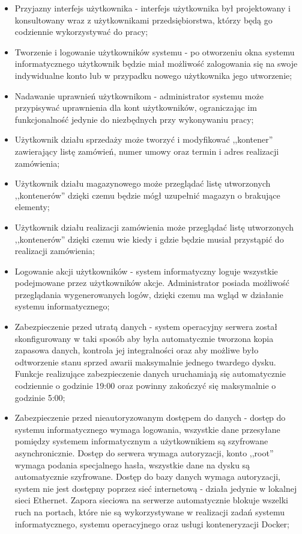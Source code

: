 \documentclass[12pt,a4paper]{article}
\begin{document}
			\begin{itemize}
				\item Przyjazny interfejs użytkownika - interfejs użytkownika był projektowany i konsultowany wraz z użytkownikami przedsiębiorstwa, którzy będą go codziennie
					wykorzystywać do pracy;
				\item Tworzenie i logowanie użytkowników systemu - po otworzeniu okna systemu informatycznego użytkownik będzie miał możliwość zalogowania się na swoje indywidualne konto
					lub w przypadku nowego użytkownika jego utworzenie;
				\item Nadawanie uprawnień użytkownikom - administrator systemu może przypisywać uprawnienia dla kont użytkowników, ograniczając im funkcjonalność jedynie do niezbędnych
					przy wykonywaniu pracy; 
				\item Użytkownik działu sprzedaży może tworzyć i modyfikować ,,kontener'' zawierający listę zamówień, numer umowy oraz termin i adres realizacji zamówienia;
				\item Użytkownik działu magazynowego może przeglądać listę utworzonych ,,kontenerów'' dzięki czemu będzie mógł uzupełnić magazyn o brakujące elementy;
				\item Użytkownik działu realizacji zamówienia może przeglądać listę utworzonych ,,kontenerów'' dzięki czemu wie kiedy i gdzie będzie musiał przystąpić do realizacji zamówienia;
				\item Logowanie akcji użytkowników - system informatyczny loguje wszystkie podejmowane przez użytkowników akcje. Administrator posiada możliwość przeglądania
					wygenerowanych logów, dzięki czemu ma wgląd w działanie systemu informatycznego;  
				\item Zabezpieczenie przed utratą danych - system operacyjny serwera został skonfigurowany w taki sposób aby była automatycznie tworzona kopia zapasowa danych,
					kontrola jej integralności oraz aby możliwe było odtworzenie stanu sprzed awarii maksymalnie jednego twardego dysku.
					Funkcje realizujące zabezpieczenie danych uruchamiają się automatycznie codziennie o godzinie 19:00 oraz powinny zakończyć się maksymalnie o godzinie 5:00;
				\item Zabezpieczenie przed nieautoryzowanym dostępem do danych - dostęp do systemu informatycznego wymaga logowania, wszystkie dane przesyłane pomiędzy systemem informatycznym
					a użytkownikiem są szyfrowane asynchronicznie. Dostęp do serwera wymaga autoryzacji, konto ,,root'' wymaga podania specjalnego hasła, wszystkie dane na dysku
					są automatycznie szyfrowane. Dostęp do bazy danych wymaga autoryzacji, system nie jest dostępny poprzez sieć internetową - działa jedynie w lokalnej sieci Ethernet.
					Zapora sieciowa na serwerze automatycznie blokuje wszelki ruch na portach, które nie są wykorzystywane w realizacji zadań systemu informatycznego, systemu operacyjnego
					oraz usługi konteneryzacji Docker;
			\end{itemize}
					
\end{document}
